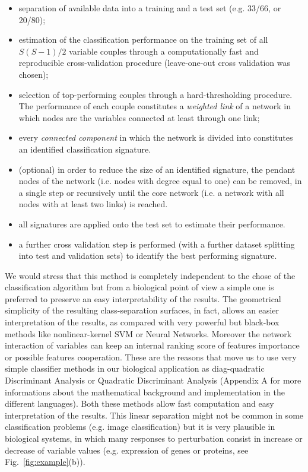 \documentclass{standalone}
\begin{document}
\begin{itemize}

\item separation of available data into a training and a test set (e.g. 33/66, or 20/80);

\item estimation of the classification performance on the training set of all $S(S-1)/2$ variable couples through a computationally fast and reproducible cross-validation procedure (leave-one-out cross validation was chosen);

\item selection of top-performing couples through a hard-thresholding procedure.
The performance of each couple constitutes a \emph{weighted link} of a network in which nodes are the variables connected at least through one link;

\item every \emph{connected component} in which the network is divided into constitutes an identified classification signature.

\item (optional) in order to reduce the size of an identified signature, the pendant nodes of the network (i.e. nodes with degree equal to one) can be removed, in a single step or recursively until the core network (i.e. a network with all nodes with at least two links) is reached.

\item all signatures are applied onto the test set to estimate their performance.

\item a further cross validation step is performed (with a further dataset splitting into test and validation sets) to identify the best performing signature.

\end{itemize}

We would stress that this method is completely independent to the chose of the classification algorithm but from a biological point of view a simple one is preferred to preserve an easy interpretability of the results.
The geometrical simplicity of the resulting class-separation surfaces, in fact, allows an easier interpretation of the results, as compared with very powerful but black-box methods like nonlinear-kernel SVM or Neural Networks.
Moreover the network interaction of variables can keep an internal ranking score of features importance or possible features cooperation.
These are the reasons that move us to use very simple classifier methods in our biological application as diag-quadratic Discriminant Analysis or Quadratic Discriminant Analysis (Appendix A for more informations about the mathematical background and implementation in the different languages).
Both these methods allow fast computation and easy interpretation of the results.
This linear separation might not be common in some classification problems (e.g. image classification) but it is very plausible in biological systems, in which many responses to perturbation consist in increase or decrease of variable values (e.g. expression of genes or proteins, see Fig.~\ref{fig:example}(b)).
\end{document}
